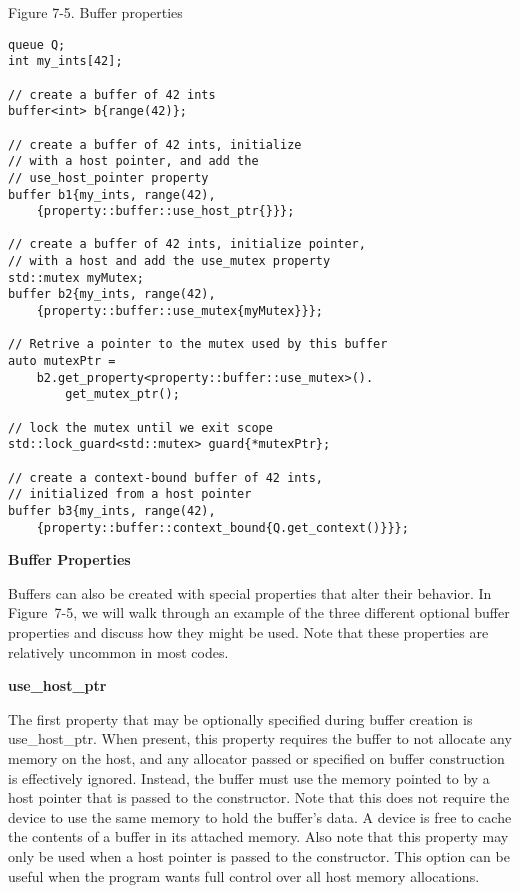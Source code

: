 \hspace*{\fill} \par %
Figure 7-5. Buffer properties
\begin{lstlisting}[caption={}]
queue Q;
int my_ints[42];

// create a buffer of 42 ints
buffer<int> b{range(42)};

// create a buffer of 42 ints, initialize 
// with a host pointer, and add the 
// use_host_pointer property
buffer b1{my_ints, range(42),
	{property::buffer::use_host_ptr{}}};

// create a buffer of 42 ints, initialize pointer,
// with a host and add the use_mutex property
std::mutex myMutex;
buffer b2{my_ints, range(42), 
	{property::buffer::use_mutex{myMutex}}};

// Retrive a pointer to the mutex used by this buffer
auto mutexPtr =
	b2.get_property<property::buffer::use_mutex>().
		get_mutex_ptr();
		
// lock the mutex until we exit scope
std::lock_guard<std::mutex> guard{*mutexPtr};

// create a context-bound buffer of 42 ints, 
// initialized from a host pointer
buffer b3{my_ints, range(42), 
	{property::buffer::context_bound{Q.get_context()}}};
\end{lstlisting}

\hspace*{\fill} \par %
\textbf{Buffer Properties}

Buffers can also be created with special properties that alter their behavior. In Figure 7-5, we will walk through an example of the three different optional buffer properties and discuss how they might be used. Note that these properties are relatively uncommon in most codes.\par

\hspace*{\fill} \par %
\textbf{use\_host\_ptr}

The first property that may be optionally specified during buffer creation is use\_host\_ptr. When present, this property requires the buffer to not allocate any memory on the host, and any allocator passed or specified on buffer construction is effectively ignored. Instead, the buffer must use the memory pointed to by a host pointer that is passed to the constructor. Note that this does not require the device to use the same memory to hold the buffer’s data. A device is free to cache the contents of a buffer in its attached memory. Also note that this property may only be used when a host pointer is passed to the constructor. This option can be useful when the program wants full control over all host memory allocations.\par


